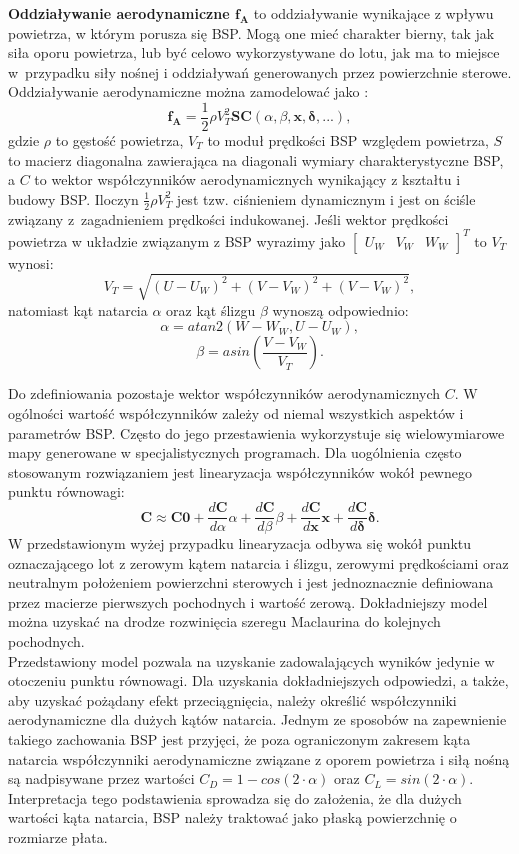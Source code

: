 \textbf{Oddziaływanie aerodynamiczne $\bm{f_A}$} to oddziaływanie wynikające z wpływu powietrza, w którym porusza się BSP. Mogą one mieć charakter bierny, tak jak siła oporu powietrza, lub być celowo wykorzystywane do lotu, jak ma to miejsce w~przypadku siły nośnej i oddziaływań generowanych przez powierzchnie sterowe. Oddziaływanie aerodynamiczne można zamodelować jako \cite{solar_plane}:
\[
	\bm{f_A} = \frac{1}{2}\rho V_{T}^2  \bm{S} \bm{C}\left(\alpha, \beta, \bm{x}, \bm{\delta}, ... \right),
\]
gdzie $\rho$ to gęstość powietrza, $V_T$ to moduł prędkości BSP względem powietrza, $S$ to macierz diagonalna zawierająca na diagonali wymiary charakterystyczne BSP, a $C$ to wektor współczynników aerodynamicznych wynikający z kształtu i budowy BSP. Iloczyn $\frac{1}{2}\rho V_{T}^2$ jest tzw. ciśnieniem dynamicznym i jest on ściśle związany z~zagadnieniem prędkości indukowanej. Jeśli wektor prędkości powietrza w układzie związanym z BSP wyrazimy jako $ \begin{bmatrix} U_W & V_W & W_W\end{bmatrix}^T$ to $V_T$ wynosi:
\[
	V_T = \sqrt{(U-U_W)^2 + (V-V_W)^2 + (V-V_W)^2},
\]
natomiast kąt natarcia $\alpha$ oraz kąt ślizgu $\beta$ wynoszą odpowiednio:
\[
	\alpha = atan2 \left( W - W_W, U - U_W \right),
\]
\[
	\beta = asin \left( \frac{V-V_W}{V_T} \right).
\]

Do zdefiniowania pozostaje wektor współczynników aerodynamicznych $C$. W ogólności wartość współczynników zależy od niemal wszystkich aspektów i parametrów BSP. Często do jego przestawienia wykorzystuje się wielowymiarowe mapy generowane w specjalistycznych programach. Dla uogólnienia często stosowanym rozwiązaniem jest linearyzacja współczynników wokół pewnego punktu równowagi:
\[
\bm{C} \approx \bm{C0} + \frac{d\bm{C}}{d\alpha}\alpha + \frac{d\bm{C}}{d\beta}\beta + \frac{d\bm{C}}{d\bm{x}}\bm{x} + \frac{d\bm{C}}{d\bm{\delta}}\bm{\delta}.
\]
W przedstawionym wyżej przypadku linearyzacja odbywa się wokół punktu oznaczającego lot z zerowym kątem natarcia i ślizgu, zerowymi prędkościami oraz neutralnym położeniem powierzchni sterowych i jest jednoznacznie definiowana przez macierze pierwszych pochodnych i wartość zerową. Dokładniejszy model można uzyskać na drodze rozwinięcia szeregu Maclaurina do kolejnych pochodnych.\\

Przedstawiony model pozwala na uzyskanie zadowalających wyników jedynie w otoczeniu punktu równowagi. Dla uzyskania dokładniejszych odpowiedzi, a także, aby uzyskać pożądany efekt przeciągnięcia, należy określić współczynniki aerodynamiczne dla dużych kątów natarcia. Jednym ze sposobów na zapewnienie takiego zachowania BSP jest przyjęci, że poza ograniczonym zakresem kąta natarcia współczynniki aerodynamiczne związane z oporem powietrza i siłą nośną są nadpisywane przez wartości $C_D = 1 - cos(2 \cdot \alpha)$ oraz $C_L = sin(2 \cdot \alpha)$. Interpretacja tego podstawienia sprowadza się do założenia, że dla dużych wartości kąta natarcia, BSP należy traktować jako płaską powierzchnię o rozmiarze płata.\\


